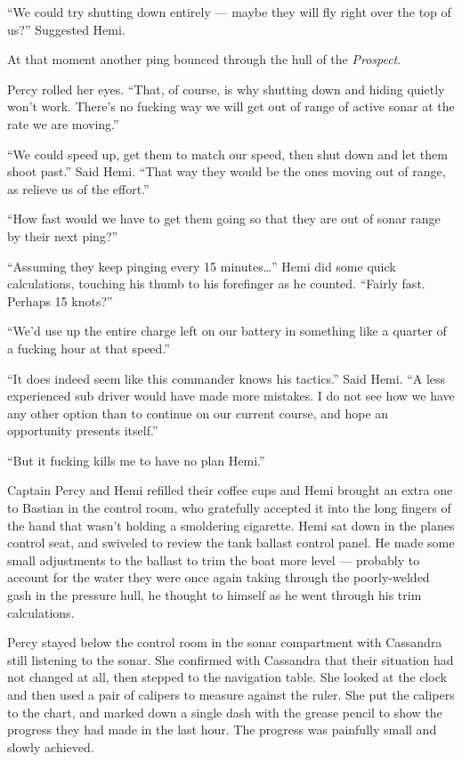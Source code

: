 \documentclass[
]{scrbook}
\begin{document}
``We could try shutting down entirely --- maybe they will fly right over
the top of us?'' Suggested Hemi.

At that moment another ping bounced through the hull of the
\emph{Prospect}.

Percy rolled her eyes. ``That, of course, is why shutting down and
hiding quietly won't work. There's no fucking way we will get out of
range of active sonar at the rate we are moving.''

``We could speed up, get them to match our speed, then shut down and let
them shoot past.'' Said Hemi. ``That way they would be the ones moving
out of range, as relieve us of the effort.''

``How fast would we have to get them going so that they are out of sonar
range by their next ping?''

``Assuming they keep pinging every 15 minutes\ldots{}'' Hemi did some
quick calculations, touching his thumb to his forefinger as he counted.
``Fairly fast. Perhaps 15 knots?''

``We'd use up the entire charge left on our battery in something like a
quarter of a fucking hour at that speed.''

``It does indeed seem like this commander knows his tactics.'' Said
Hemi. ``A less experienced sub driver would have made more mistakes. I
do not see how we have any other option than to continue on our current
course, and hope an opportunity presents itself.''

``But it fucking kills me to have no plan Hemi.''

Captain Percy and Hemi refilled their coffee cups and Hemi brought an
extra one to Bastian in the control room, who gratefully accepted it
into the long fingers of the hand that wasn't holding a smoldering
cigarette. Hemi sat down in the planes control seat, and swiveled to
review the tank ballast control panel. He made some small adjustments to
the ballast to trim the boat more level --- probably to account for the
water they were once again taking through the poorly-welded gash in the
pressure hull, he thought to himself as he went through his trim
calculations.

Percy stayed below the control room in the sonar compartment with
Cassandra still listening to the sonar. She confirmed with Cassandra
that their situation had not changed at all, then stepped to the
navigation table. She looked at the clock and then used a pair of
calipers to measure against the ruler. She put the calipers to the
chart, and marked down a single dash with the grease pencil to show the
progress they had made in the last hour. The progress was painfully
small and slowly achieved.
\end{document}
